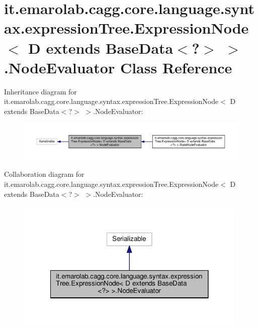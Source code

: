 \hypertarget{classit_1_1emarolab_1_1cagg_1_1core_1_1language_1_1syntax_1_1expressionTree_1_1ExpressionNode_3_0aba337608b0c3862b39683f89fe93b2}{\section{it.\-emarolab.\-cagg.\-core.\-language.\-syntax.\-expression\-Tree.\-Expression\-Node$<$ D extends Base\-Data$<$?$>$ $>$.Node\-Evaluator Class Reference}
\label{classit_1_1emarolab_1_1cagg_1_1core_1_1language_1_1syntax_1_1expressionTree_1_1ExpressionNode_3_0aba337608b0c3862b39683f89fe93b2}
}


Inheritance diagram for it.\-emarolab.\-cagg.\-core.\-language.\-syntax.\-expression\-Tree.\-Expression\-Node$<$ D extends Base\-Data$<$?$>$ $>$.Node\-Evaluator\-:\nopagebreak
\begin{figure}[H]
\begin{center}
\leavevmode
\includegraphics[width=350pt]{classit_1_1emarolab_1_1cagg_1_1core_1_1language_1_1syntax_1_1expressionTree_1_1ExpressionNode_3_29d65e35c57e75d5c475d096cf70b7a5}
\end{center}
\end{figure}


Collaboration diagram for it.\-emarolab.\-cagg.\-core.\-language.\-syntax.\-expression\-Tree.\-Expression\-Node$<$ D extends Base\-Data$<$?$>$ $>$.Node\-Evaluator\-:\nopagebreak
\begin{figure}[H]
\begin{center}
\leavevmode
\includegraphics[width=314pt]{classit_1_1emarolab_1_1cagg_1_1core_1_1language_1_1syntax_1_1expressionTree_1_1ExpressionNode_3_3d8cd94abd9c8c6cb3979a9d54ccde05}
\end{center}
\end{figure}
